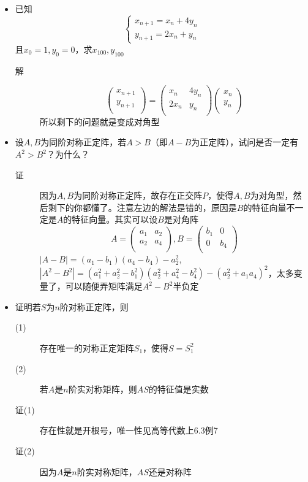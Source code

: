 \begin{itemize}
\item 已知
\[
\begin{cases}
x_{n+1}=x_n+4y_n\\
y_{n+1}=2x_n+y_n
\end{cases}
\]
且$x_0=1,y_0=0$，求$x_{100},y_{100}$
\begin{description}
\item[解]
\[
\left(
\begin{array}{c}
x_{n+1}\\
y_{n+1}\\
\end{array}
\right) = \left(
\begin{array}{cc}
x_n & 4y_n\\
2x_n & y_n\\
\end{array}
\right)
\left(
\begin{array}{c}
x_{n}\\
y_{n}\\
\end{array}
\right)
\]
所以剩下的问题就是变成对角型
\end{description}

\item 设$A,B$为同阶对称正定阵，若$A>B$（即$A-B$为正定阵），试问是否一定有$A^2>B^2$？为什么？
\begin{description}
\item[证] 因为$A,B$为同阶对称正定阵，故存在正交阵$P$，使得$A,B$为对角型，然后剩下的你都懂了。注意左边的解法是错的，原因是$B$的特征向量不一定是$A$的特征向量。其实可以设$B$是对角阵
\[
A = \left(
\begin{array}{cc}
a_1 & a_2\\
a_2 & a_4\\
\end{array}
\right),B = \left(
\begin{array}{cc}
b_1 & 0\\
0 & b_4\\
\end{array}
\right)
\]
$|A-B|=(a_1-b_1)(a_4-b_4)-a_2^2$,$|A^2-B^2|=(a_1^2+a_2^2-b_1^2)(a_2^2+a_4^2-b_4^2)-(a_2^2+a_1a_4)^2$，太多变量了，可以随便弄矩阵满足$A^2-B^2$半负定
\end{description}

\item 证明若$S$为$n$阶对称正定阵，则
\begin{description}
\item[(1)] 存在唯一的对称正定矩阵$S_1$，使得$S=S_1^2$
\item[(2)] 若$A$是$n$阶实对称矩阵，则$AS$的特征值是实数
\item[证(1)] 存在性就是开根号，唯一性见高等代数上6.3例7
\item[证(2)] 因为$A$是$n$阶实对称矩阵，$AS$还是对称阵
\end{description}


\end{itemize}
